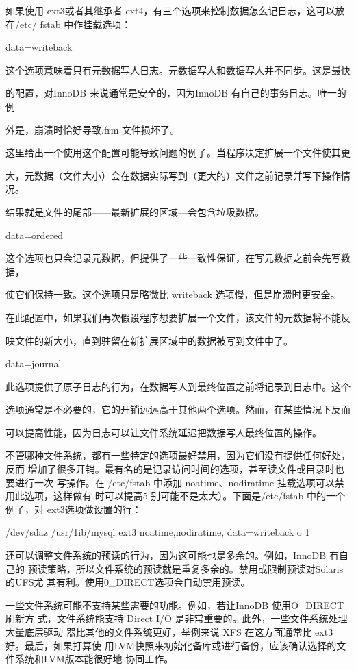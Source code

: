 如果使用 ext3或者其继承者 ext4，有三个选项来控制数据怎么记日志，这可以放在/etc/
fstab 中作挂载选项：

data=writeback

这个选项意味着只有元数据写人日志。元数据写人和数据写人并不同步。这是最快

的配置，对InnoDB 来说通常是安全的，因为InnoDB 有自己的事务日志。唯一的例

外是，崩溃时恰好导致.frm 文件损坏了。

这里给出一个使用这个配置可能导致问题的例子。当程序决定扩展一个文件使其更

大，元数据（文件大小）会在数据实际写到（更大的）文件之前记录并写下操作情况。

结果就是文件的尾部——最新扩展的区域—会包含垃圾数据。

data=ordered

这个选项也只会记录元数据，但提供了一些一致性保证，在写元数据之前会先写数据，

使它们保持一致。这个选项只是略微比 writeback 选项慢，但是崩溃时更安全。

在此配置中，如果我们再次假设程序想要扩展一个文件，该文件的元数据将不能反

映文件的新大小，直到驻留在新扩展区域中的数据被写到文件中了。

data=journal

此选项提供了原子日志的行为，在数据写人到最终位置之前将记录到日志中。这个

选项通常是不必要的，它的开销远远高于其他两个选项。然而，在某些情况下反而

可以提高性能，因为日志可以让文件系统延迟把数据写人最终位置的操作。

不管哪种文件系统，都有一些特定的选项最好禁用，因为它们没有提供任何好处，反而
增加了很多开销。最有名的是记录访问时间的选项，甚至读文件或目录时也要进行一次
写操作。在 /etc/fstab 中添加 noatime、nodiratime 挂载选项可以禁用此选项，这样做有
时可以提高5%
别可能不是太大）。下面是/etc/fstab 中的一个例子，对 ext3选项做设置的行：

/dev/sdaz /usr/1ib/mysql ext3 noatime,nodiratime, data=writeback o 1

还可以调整文件系统的预读的行为，因为这可能也是多余的。例如，InnoDB 有自己的
预读策略，所以文件系统的预读就是重复多余的。禁用或限制预读对Solaris 的UFS尤
其有利。使用0\_DIRECT选项会自动禁用预读。

一些文件系统可能不支持某些需要的功能。例如，若让InnoDB 使用O\_DIRECT刷新方
式，文件系统能支持 Direct I/O 是非常重要的。此外，一些文件系统处理大量底层驱动
器比其他的文件系统更好，举例来说 XFS 在这方面通常比 ext3好。最后，如果打算使
用LVM快照来初始化备库或进行备份，应该确认选择的文件系统和LVM版本能很好地
协同工作。

